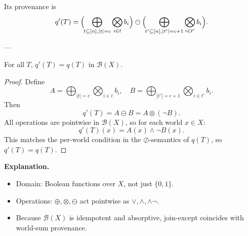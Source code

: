 Its provenance is
\[
q'(T)=\Bigl(\!\bigoplus_{t\subseteq[n],|t|=c}\bigotimes_{i\in t}b_i\Bigr)
\ominus
\Bigl(\!\bigoplus_{t'\subseteq[n],|t'|=c+1}\bigotimes_{i\in t'}b_i\Bigr).
\]

---

\begin{proposition}
For all \(T\), \(q'(T)=q(T)\) in \(\mathcal{B}(X)\).
\end{proposition}

\begin{proof}
Define
\[
A=\bigoplus_{|t|=c}\bigotimes_{i\in t}b_i, \quad
B=\bigoplus_{|t'|=c+1}\bigotimes_{i\in t'}b_i.
\]
Then
\[
q'(T)=A\ominus B=A\otimes(\neg B).
\]
All operations are pointwise in \(\mathcal{B}(X)\), so for each world \(x\in X\):
\[
q'(T)(x)=A(x)\wedge\neg B(x).
\]
This matches the per-world condition in the $\oslash$-semantics of $q(T)$, so $q'(T)=q(T)$.
\end{proof}

\noindent\textbf{Explanation.}
\begin{itemize}
  \item Domain: Boolean functions over $X$, not just $\{0,1\}$.  
  \item Operations: $\oplus,\otimes,\ominus$ act pointwise as $\vee,\wedge,\wedge\neg$.  
  \item Because $\mathcal{B}(X)$ is idempotent and absorptive, join-except coincides with world-sum provenance.
\end{itemize}              


